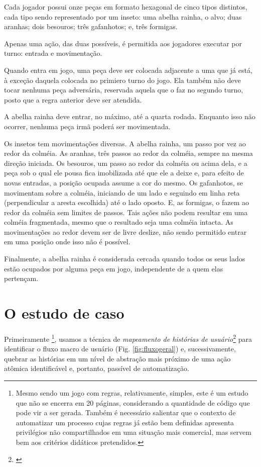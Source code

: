 \documentclass[12pt,a4paper,oneside,english,brazil]{article}
\begin{document}
    Cada jogador possui onze peças em formato hexagonal de cinco tipos
    distintos, cada tipo sendo representado por um inseto: uma abelha rainha, o
    alvo; duas aranhas; dois besouros; três gafanhotos; e, três formigas.

    Apenas uma ação, das duas possíveis, é permitida aos jogadores executar por
    turno: entrada e movimentação.

    Quando entra em jogo, uma peça deve ser colocada adjacente a uma que já
    está, à exceção daquela colocada no primiero turno do jogo. Ela também não
    deve tocar nenhuma peça adversária, reservada aquela que o faz no segundo
    turno, posto que a regra anterior deve ser atendida.

    A abelha rainha deve entrar, no máximo, até a quarta rodada. Enquanto isso
    não ocorrer, nenhuma peça irmã poderá ser movimentada.

    Os insetos tem movimentações diversas. A abelha rainha, um passo por vez ao
    redor da colméia. As aranhas, três passos ao redor da colméia, sempre na
    mesma direção iniciada. Os besouros, um passo ao redor da colméia ou acima
    dela, e a peça sob o qual ele pousa fica imobilizada até que ele a deixe e,
    para efeito de novas entradas, a posição ocupada assume a cor do mesmo. Os
    gafanhotos, se movimentam sobre a colméia, iniciando de um lado e seguindo
    em linha reta (perpendicular a aresta escolhida) até o lado oposto.
    E,  as formigas, o fazem ao redor da colméia sem limites de passos. Tais
    ações não podem resultar em uma colméia fragmentada, mesmo que o resultado
    seja uma colméia intacta. As movimentações ao redor devem ser de livre
    deslize, não sendo permitido entrar em uma posição onde isso não é possível.

    Finalmente, a abelha rainha é considerada cercada quando todos os seus lados
    estão ocupados por alguma peça em jogo, independente de a quem elas
    pertençam.

  \section{O estudo de caso}

    Primeiramente
    \footnote{Mesmo sendo um jogo com regras, relativamente,
    simples, este é um estudo que não se encerra em 20 páginas, considerando a
    quantidade de código que pode vir a ser gerada. Também é necessário
    salientar que o contexto de automatizar um processo cujas regras já estão
    bem definidas apresenta privilégios não compartilhados em uma situação mais
    comercial, mas servem bem aos critérios didáticos pretendidos.},
    usamos a técnica de \emph{mapeamento de histórias de usuário}\footnote{
    \cite{Patton2014}} para identificar o fluxo macro de usuário (Fig.
    \ref{fig:fluxogeral}) e, sucessivamente, quebrar as histórias em um nível de
    abstração mais próximo de uma ação atômica identificável e, portanto,
    passível de automatização.
\end{document}
